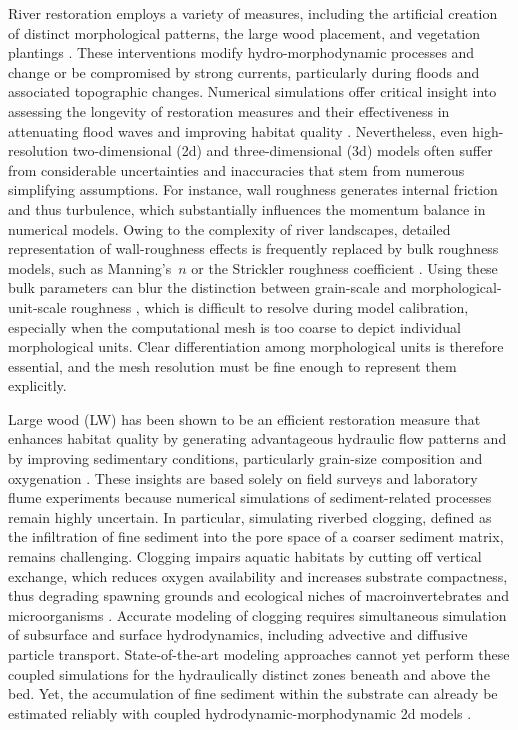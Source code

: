 \documentclass[draft,linenumbers,onecolumn]{agujournal2019} %
\begin{document}
River restoration employs a variety of measures, including the artificial creation of distinct morphological patterns, the large wood placement, and vegetation plantings \cite{schwindt2019hydromorphological, kail2007use, roni2015wood, grabowski2019current, neuhaus2021engineered}. These interventions modify hydro-morphodynamic processes and change or be compromised by strong currents, particularly during floods and associated topographic changes. Numerical simulations offer critical insight into assessing the longevity of restoration measures and their effectiveness in attenuating flood waves and improving habitat quality \cite{schwindt2020river}. Nevertheless, even high-resolution two-dimensional (2d) and three-dimensional (3d) models often suffer from considerable uncertainties and inaccuracies that stem from numerous simplifying assumptions. For instance, wall roughness generates internal friction and thus turbulence, which substantially influences the momentum balance in numerical models. Owing to the complexity of river landscapes, detailed representation of wall-roughness effects is frequently replaced by bulk roughness models, such as Manning's~$n$ \cite{manning1891flow} or the Strickler roughness coefficient \cite{strickler1923beitrage, meyer-peter1948formulas}. Using these bulk parameters can blur the distinction between grain-scale and morphological-unit-scale roughness \cite{ferguson2007flow}, which is difficult to resolve during model calibration, especially when the computational mesh is too coarse to depict individual morphological units. Clear differentiation among morphological units is therefore essential, and the mesh resolution must be fine enough to represent them explicitly.

Large wood (LW) has been shown to be an efficient restoration measure that enhances habitat quality by generating advantageous hydraulic flow patterns \cite{follett2020momentum, schalko2024enhanced} and by improving sedimentary conditions, particularly grain-size composition and oxygenation \cite{schwindt2023fuzzylogic, schalko2024flow}. These insights are based solely on field surveys and laboratory flume experiments because numerical simulations of sediment-related processes remain highly uncertain. In particular, simulating riverbed clogging, defined as the infiltration of fine sediment into the pore space of a coarser sediment matrix, remains challenging. Clogging impairs aquatic habitats by cutting off vertical exchange, which reduces oxygen availability and increases substrate compactness, thus degrading spawning grounds and ecological niches of macroinvertebrates and microorganisms \cite{banscher1976gesetzmassigkeiten, brunke1997ecological, blaschke2003clogging}. Accurate modeling of clogging requires simultaneous simulation of subsurface and surface hydrodynamics, including advective and diffusive particle transport. State-of-the-art modeling approaches cannot yet perform these coupled simulations for the hydraulically distinct zones beneath and above the bed. Yet, the accumulation of fine sediment within the substrate can already be estimated reliably with coupled hydrodynamic-morphodynamic 2d models \cite{scolari2025hydromorphodynamic}.
\end{document}

